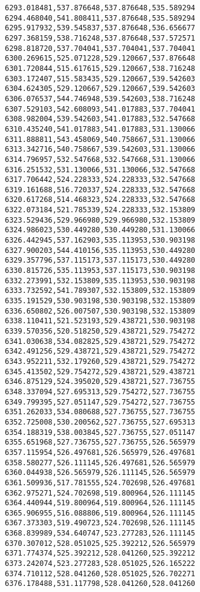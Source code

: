 \documentclass[11pt]{article}
\begin{document}
\begin{Verbatim}[commandchars=\\\{\}]
6293.018481,537.876648,537.876648,535.589294
6294.468040,541.808411,537.876648,535.589294
6295.917932,539.545837,537.876648,536.656677
6297.368159,538.716248,537.876648,537.572571
6298.818720,537.704041,537.704041,537.704041
6300.269615,525.071228,529.120667,537.876648
6301.720844,515.617615,529.120667,538.716248
6303.172407,515.583435,529.120667,539.542603
6304.624305,529.120667,529.120667,539.542603
6306.076537,544.746948,539.542603,538.716248
6307.529103,542.608093,541.017883,537.704041
6308.982004,539.542603,541.017883,532.547668
6310.435240,541.017883,541.017883,531.130066
6311.888811,543.458069,540.758667,531.130066
6313.342716,540.758667,539.542603,531.130066
6314.796957,532.547668,532.547668,531.130066
6316.251532,531.130066,531.130066,532.547668
6317.706442,524.228333,524.228333,532.547668
6319.161688,516.720337,524.228333,532.547668
6320.617268,514.468323,524.228333,532.547668
6322.073184,521.785339,524.228333,532.153809
6323.529436,529.966980,529.966980,532.153809
6324.986023,530.449280,530.449280,531.130066
6326.442945,537.162903,535.113953,530.903198
6327.900203,544.410156,535.113953,530.449280
6329.357796,537.115173,537.115173,530.449280
6330.815726,535.113953,537.115173,530.903198
6332.273991,532.153809,535.113953,530.903198
6333.732592,541.789307,532.153809,532.153809
6335.191529,530.903198,530.903198,532.153809
6336.650802,526.007507,530.903198,532.153809
6338.110411,521.523193,529.438721,530.903198
6339.570356,520.518250,529.438721,529.754272
6341.030638,534.082825,529.438721,529.754272
6342.491256,529.438721,529.438721,529.754272
6343.952211,532.179260,529.438721,529.754272
6345.413502,529.754272,529.438721,529.438721
6346.875129,524.395020,529.438721,527.736755
6348.337094,527.695313,529.754272,527.736755
6349.799395,527.051147,529.754272,527.736755
6351.262033,534.080688,527.736755,527.736755
6352.725008,530.200562,527.736755,527.695313
6354.188319,538.003845,527.736755,527.051147
6355.651968,527.736755,527.736755,526.565979
6357.115954,526.497681,526.565979,526.497681
6358.580277,526.111145,526.497681,526.565979
6360.044938,526.565979,526.111145,526.565979
6361.509936,517.781555,524.702698,526.497681
6362.975271,524.702698,519.800964,526.111145
6364.440944,519.800964,519.800964,526.111145
6365.906955,516.088806,519.800964,526.111145
6367.373303,519.490723,524.702698,526.111145
6368.839989,534.640747,523.277283,526.111145
6370.307012,528.051025,525.392212,526.565979
6371.774374,525.392212,528.041260,525.392212
6373.242074,523.277283,528.051025,526.165222
6374.710112,528.041260,528.051025,526.702271
6376.178488,531.117798,528.041260,528.041260

\end{Verbatim}
\end{document}
